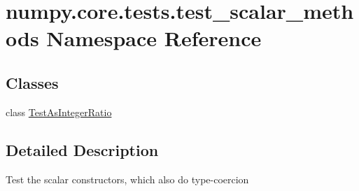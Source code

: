 \hypertarget{namespacenumpy_1_1core_1_1tests_1_1test__scalar__methods}{}\section{numpy.\+core.\+tests.\+test\+\_\+scalar\+\_\+methods Namespace Reference}
\label{namespacenumpy_1_1core_1_1tests_1_1test__scalar__methods}
\subsection*{Classes}
\begin{DoxyCompactItemize}
\item 
class \hyperlink{classnumpy_1_1core_1_1tests_1_1test__scalar__methods_1_1TestAsIntegerRatio}{Test\+As\+Integer\+Ratio}
\end{DoxyCompactItemize}


\subsection{Detailed Description}
\begin{DoxyVerb}Test the scalar constructors, which also do type-coercion
\end{DoxyVerb}
 
